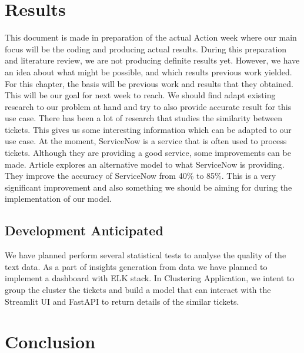 \documentclass[a4paper,12pt]{report}
\begin{document}
    \chapter{Results}
    This document is made in preparation of the actual Action week where our main focus will be the coding and producing actual results. During this preparation and literature review, we are not producing definite results yet. However, we have an idea about what might be possible, and which results previous work yielded. For this chapter, the basis will be previous work and results that they obtained. This will be our goal for next week to reach. We should find adapt existing research to our problem at hand and try to also provide accurate result for this use case.
    \newline\newline
    There has been a lot of research that studies the similarity between tickets. This gives us some interesting information which can be adapted to our use case. At the moment, ServiceNow is a service that is often used to process tickets. Although they are providing a good service, some improvements can be made. Article \cite{Garrett2020} explores an alternative model to what ServiceNow is providing. They improve the accuracy of ServiceNow from 40\% to 85\%. This is a very significant improvement and also something we should be aiming for during the implementation of our model.

    \section{Development Anticipated}
    We have planned perform several statistical tests to analyse the quality of the text data.
    As a part of insights generation from data we have planned to implement a dashboard with ELK stack. In Clustering Application, we intent to group the cluster the tickets and build a model that can interact with the Streamlit UI and FastAPI to return details of the similar tickets.

    
    \chapter{Conclusion}


    

    
    
\end{document}
